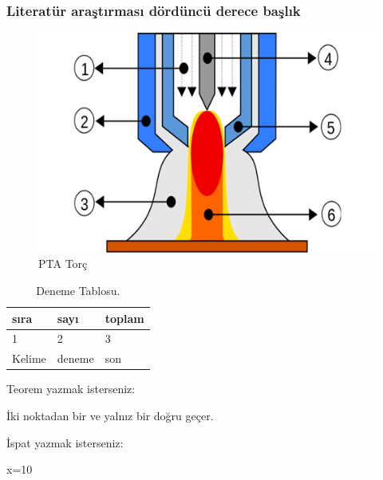 \subsubsection{Literatür araştırması dördüncü derece başlık}
\lipsum[1-2]
\begin{figure}[h]
\centering
\includegraphics[width=\textwidth]{gorseller/ptaTorc}
\caption{PTA Torç}\label{fig:PtaTorc1}
\end{figure}
\lipsum[1-2]
\begin{table}
\centering
\caption{Deneme Tablosu.}\label{tab:den1}
\begin{tabular}{|l|l|l|}
\hline
sıra   & sayı   & toplam \\ \hline
1      & 2      & 3      \\ \hline
Kelime & deneme & son    \\ \hline
\end{tabular}
\end{table}

Teorem yazmak isterseniz:
\begin{theorem}[Öklid]
 İki noktadan bir ve yalnız bir doğru geçer.
\end{theorem}

İspat yazmak isterseniz:
\begin{ispat}
x=10
\end{ispat}